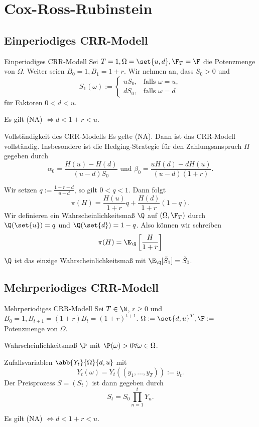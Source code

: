 \section{Cox-Ross-Rubinstein}

\subsection{Einperiodiges CRR-Modell}

\begin{karte}{Einperiodiges CRR-Modell}
Sei \(T = 1, \Omega = \set{u, d}, \F_T = \F\) die Potenzmenge von \(\Omega\).
Weiter seien \(B_0 = 1, B_1 = 1+r\). Wir nehmen an, dass \(S_0>0\) und 
\[ S_1(\omega) := \begin{cases}
    u S_0, &\text{falls } \omega = u, \\
    d S_0, &\text{falls } \omega = d
\end{cases} \]
für Faktoren \(0 < d < u\).

Es gilt (NA) \(\Leftrightarrow d < 1+r < u\).
\end{karte}

\begin{karte}{Vollständigkeit des CRR-Modells}
Es gelte (NA). Dann ist das CRR-Modell vollständig. 
Insbesondere ist die Hedging-Strategie für den Zahlungsanspruch \(H\) gegeben durch 
\[ \alpha_0 = \frac{H(u) - H(d)}{(u-d)S_0} \text{ und } \beta_0 = \frac{u H(d) - d H(u)}{(u-d)(1+r)}. \]

Wir setzen \(q := \frac{1+r-d}{u-d}\), so gilt \(0<q<1\). Dann folgt 
\[ \pi(H) = \frac{H(u)}{1+r} q + \frac{H(d)}{1+r}(1-q). \]
Wir definieren ein Wahrscheinlichkeitsmaß \(\Q\) auf \((\Omega, \F_T)\) durch 
\(\Q(\set{u}) = q\) und \(\Q(\set{d}) = 1-q\). Also können wir schreiben 
\[ \pi(H) = \E_\Q \left[\frac{H}{1+r}\right] \]
\(\Q\) ist das einzige Wahrscheinlichkeitsmaß mit \(\E_\Q [ \tilde{S}_1] = \tilde{S}_0\).
\end{karte}

\subsection{Mehrperiodiges CRR-Modell}

\begin{karte}{Mehrperiodiges CRR-Modell}
Sei \(T\in \N\), \(r \geq 0\) und \(B_0 = 1, B_{t+1} = (1+r)B_t = (1+r)^{t+1}\).
\(\Omega := \set{d,u}^T, \F:=\) Potenzmenge von \(\Omega\). 

Wahrscheinlichkeitsmaß \(\P\) mit \(\P(\omega)>0 \forall \omega \in \Omega\).

Zufallsvariablen \(\abb{Y_t}{\Omega}{d,u}\) mit 
\[ Y_t(\omega) = Y_t((y_1, \ldots, y_T)) := y_t. \]
Der Preisprozess \(S = (S_t)\) ist dann gegeben durch 
\[ S_t = S_0 \prod_{n=1}^t Y_n. \]

Es gilt (NA) \(\Leftrightarrow d < 1+r < u\).
\end{karte}

